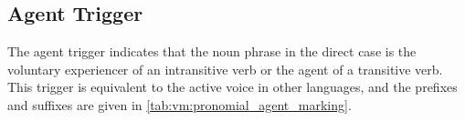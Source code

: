 \documentclass[grammar]{subfiles}
\begin{document}
% 
% 
% 


\clearpage
\subsection{Agent Trigger}
\label{ssec:vm:agt_trigger}

The agent trigger indicates that the noun phrase in the direct case is the
voluntary experiencer of an intransitive verb or the agent of a transitive
verb.  This trigger is equivalent to the active voice in other languages, and
the prefixes and suffixes are given in \cref{tab:vm:pronomial_agent_marking}.
\end{document}
